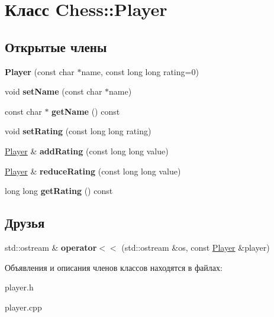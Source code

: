 \hypertarget{class_chess_1_1_player}{}\section{Класс Chess\+:\+:Player}
\label{class_chess_1_1_player}
\subsection*{Открытые члены}
\begin{DoxyCompactItemize}
\item 
\mbox{\label{class_chess_1_1_player_a3ea018efe28264e87808c82f97d71c5e}} 
{\bfseries Player} (const char $\ast$name, const long long rating=0)
\item 
\mbox{\label{class_chess_1_1_player_a6e2b81aecdac98135da1c05a231cc4bc}} 
void {\bfseries set\+Name} (const char $\ast$name)
\item 
\mbox{\label{class_chess_1_1_player_ac02bf8b66e1d1e476fcee572bc91ac85}} 
const char $\ast$ {\bfseries get\+Name} () const
\item 
\mbox{\label{class_chess_1_1_player_ac4891c8757a4feb6d0d0aac8d127f163}} 
void {\bfseries set\+Rating} (const long long rating)
\item 
\mbox{\label{class_chess_1_1_player_ae30b121959ec3088d9c9c514faba72ae}} 
\mbox{\hyperlink{class_chess_1_1_player}{Player}} \& {\bfseries add\+Rating} (const long long value)
\item 
\mbox{\label{class_chess_1_1_player_a0dfde9f2462faa0da76a54bca4b56fbc}} 
\mbox{\hyperlink{class_chess_1_1_player}{Player}} \& {\bfseries reduce\+Rating} (const long long value)
\item 
\mbox{\label{class_chess_1_1_player_a183ccce7828e84e2950078729f8d7fed}} 
long long {\bfseries get\+Rating} () const
\end{DoxyCompactItemize}
\subsection*{Друзья}
\begin{DoxyCompactItemize}
\item 
\mbox{\label{class_chess_1_1_player_aeb31617a48e2242cbb1a0e8be2cb1544}} 
std\+::ostream \& {\bfseries operator$<$$<$} (std\+::ostream \&os, const \mbox{\hyperlink{class_chess_1_1_player}{Player}} \&player)
\end{DoxyCompactItemize}


Объявления и описания членов классов находятся в файлах\+:\begin{DoxyCompactItemize}
\item 
player.\+h\item 
player.\+cpp\end{DoxyCompactItemize}
